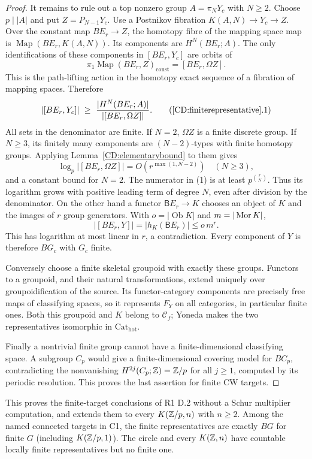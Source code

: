 \begin{proof}
It remains to rule out a top nonzero group $A=\pi_NY_c$ with $N\ge2$.
Choose $p\mid|A|$ and put $Z=P_{N-1}Y_c$.
Use a Postnikov fibration $K(A,N)\to Y_c\to Z$.
Over the constant map $BE_r\to Z$, the homotopy fibre of the mapping
space map is $\operatorname{Map}(BE_r,K(A,N))$.
Its components are $H^N(BE_r;A)$.  The only identifications of these
components in $[BE_r,Y_c]$ are orbits of
\[
 \pi_1\operatorname{Map}(BE_r,Z)_{\mathrm{const}}
       =[BE_r,\Omega Z].
\]
This is the path-lifting action in the homotopy exact sequence of a
fibration of mapping spaces.  Therefore
\[
 |[BE_r,Y_c]|\ \ge\
 \frac{|H^N(BE_r;A)|}{|[BE_r,\Omega Z]|}.
 \tag{\ref{CD:finiterepresentative}.1}
\]
All sets in the denominator are finite.  If $N=2$, $\Omega Z$ is a
finite discrete group.  If $N\ge3$, its finitely many components are
$(N-2)$-types with finite homotopy groups.  Applying
Lemma~\ref{CD:elementarybound} to them gives
\[
 \log_p|[BE_r,\Omega Z]|=O\!\left(r^{\max(1,N-2)}\right)
 \quad(N\ge3),
\]
and a constant bound for $N=2$.  The numerator in (1) is at least
$p^{\binom rN}$.  Thus its logarithm grows with positive leading term
of degree $N$, even after division by the denominator.
On the other hand a functor $\mathsf BE_r\to K$ chooses an object of
$K$ and the images of $r$ group generators.  With
$o=|\operatorname{Ob}K|$ and $m=|\operatorname{Mor} K|$,
\[
           |[BE_r,Y]|=|h_K(\mathsf BE_r)|\le o\,m^r.
\]
This has logarithm at most linear in $r$, a contradiction.
Every component of $Y$ is therefore $BG_c$ with $G_c$ finite.

Conversely choose a finite skeletal groupoid with exactly these groups.
Functors to a groupoid, and their natural transformations, extend
uniquely over groupoidification of the source.  Its functor-category
components are precisely free maps of classifying spaces, so it
represents $F_Y$ on all categories, in particular finite ones.
Both this groupoid and $K$ belong to $\mathcal C_f$; Yoneda makes the
two representatives isomorphic in $\mathrm{Cat}_{\mathrm{hot}}$.

Finally a nontrivial finite group cannot have a finite-dimensional
classifying space.  A subgroup $C_p$ would give a finite-dimensional
covering model for $BC_p$, contradicting the nonvanishing
$H^{2j}(C_p;\mathbb Z)=\mathbb Z/p$ for all $j\ge1$, computed by its periodic
resolution.  This proves the last assertion for finite CW targets.
\end{proof}

This proves the finite-target conclusions of R1 D.2 without a Schur
multiplier computation, and extends them to every $K(\mathbb Z/p,n)$ with
$n\ge2$.  Among the named connected targets in C1, the finite
representatives are exactly $BG$ for finite $G$ (including
$K(\mathbb Z/p,1)$).  The circle and every $K(\mathbb Z,n)$ have countable locally
finite representatives but no finite one.


